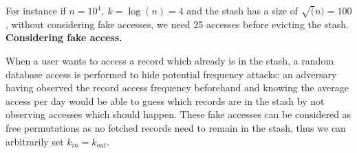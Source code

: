 \documentclass[english,oneside,twocolumn]{article}
\begin{document}
For instance if $n=10^4,\ k=\log(n)=4$ and the stash has a size of $\sqrt(n)=100$, without considering fake accesses, we need 25 accesses before evicting the stash.\\

\noindent\textbf{Considering fake access.}

When a user wants to access a record which already is in the stash, a random database access is performed to hide potential frequency attacks: an adversary having observed the record access frequency beforehand and knowing the average access per day would be able to guess which records are in the stash by not observing accesses which should happen.
These fake accesses can be considered as free permutations as no fetched records need to remain in the stash, thus we can arbitrarily set $k_{in}=k_{out}$.
\end{document}
